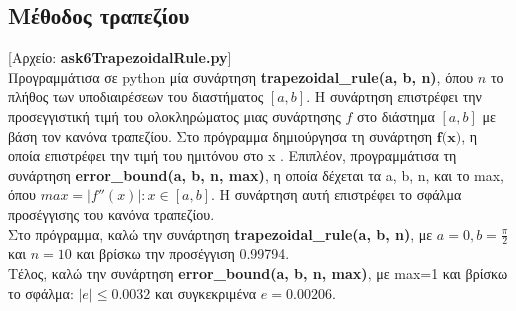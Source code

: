 \documentclass{article}
\newcommand{\lt}{\latintext}
\newcommand{\gt}{\greektext}
\begin{document}
\subsection{Μέθοδος τραπεζίου}
[Αρχείο: \lt \textbf{ask6TrapezoidalRule.py}] \gt \\
Προγραμμάτισα σε \lt python \gt μία συνάρτηση \lt \textbf{trapezoidal{\_}rule(a, b, n)}, \gt όπου $n$ το πλήθος των υποδιαιρέσεων του διαστήματος $[a,b]$. Η συνάρτηση επιστρέφει την προσεγγιστική τιμή του ολοκληρώματος μιας συνάρτησης $f$ στο διάστημα $[a,b]$ με βάση τον κανόνα τραπεζίου. Στο πρόγραμμα δημιούργησα τη συνάρτηση \lt $\textbf{f(x)}$, \gt η οποία επιστρέφει την τιμή του ημιτόνου στο \lt x \gt . Επιπλέον, προγραμμάτισα τη συνάρτηση \lt \textbf{error{\_}bound(a, b, n, max)}, \gt η οποία δέχεται τα \lt a, b, n, \gt και το \lt max, \gt όπου $max=|f''(x)|: x\in[a,b]$. Η συνάρτηση αυτή επιστρέφει το σφάλμα προσέγγισης του κανόνα τραπεζίου. \\
Στο πρόγραμμα, καλώ την συνάρτηση \lt \textbf{trapezoidal{\_}rule(a, b, n)}, \gt με $a=0, b=\frac{\pi}{2}$ και $n=10$ και βρίσκω την προσέγγιση 0.99794. \\
Τέλος, καλώ την συνάρτηση \lt \textbf{error{\_}bound(a, b, n, max)}, \gt με \lt max=1 \gt και βρίσκω το σφάλμα: $|e|\leq0.0032$ και συγκεκριμένα $e=0.00206$.
\end{document}

